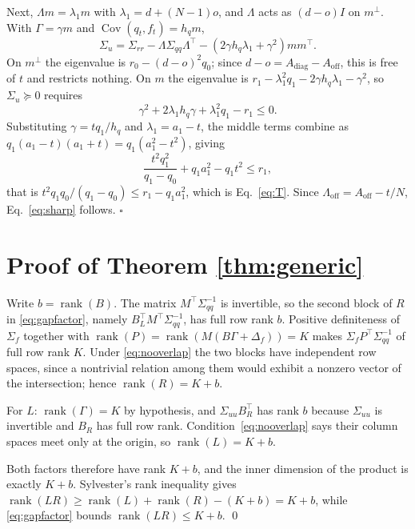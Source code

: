 \documentclass[10pt,twocolumn]{article}
\theoremstyle{remark}
\newcommand{\Cov}{\operatorname{Cov}}
\newcommand{\rank}{\operatorname{rank}}
\begin{document}
Next, $\Lambda m=\lambda_1m$ with $\lambda_1=d+(N-1)o$, and $\Lambda$ acts as
$(d-o)I$ on $m^\perp$. With $\Gamma=\gamma m$ and $\Cov(q_t,f_t)=h_qm$,
\begin{equation}
\Sigma_u=\Sigma_{rr}-\Lambda\Sigma_{qq}\Lambda^\top
-(2\gamma h_q\lambda_1+\gamma^2)mm^\top.
\end{equation}
On $m^\perp$ the eigenvalue is $r_0-(d-o)^2q_0$; since $d-o=A_{\mathrm{diag}}
-A_{\mathrm{off}}$, this is free of $t$ and restricts nothing. On $m$ the
eigenvalue is $r_1-\lambda_1^2q_1-2\gamma h_q\lambda_1-\gamma^2$, so
$\Sigma_u\succeq0$ requires
\begin{equation}
\gamma^2+2\lambda_1h_q\gamma+\lambda_1^2q_1-r_1\le0.
\end{equation}
Substituting $\gamma=tq_1/h_q$ and $\lambda_1=a_1-t$, the middle terms combine
as $q_1(a_1-t)(a_1+t)=q_1(a_1^2-t^2)$, giving
\begin{equation}
\frac{t^2q_1^2}{q_1-q_0}+q_1a_1^2-q_1t^2\le r_1,
\end{equation}
that is $t^2q_1q_0/(q_1-q_0)\le r_1-q_1a_1^2$, which is Eq.~\eqref{eq:T}.
Since $\Lambda_{\mathrm{off}}=A_{\mathrm{off}}-t/N$, Eq.~\eqref{eq:sharp}
follows.
\hfill$\square$

\section{Proof of Theorem \ref{thm:generic}}
\label{app:generic}

Write $b=\rank(B)$. The matrix $M^\top\Sigma_{qq}^{-1}$ is invertible, so the
second block of $R$ in \eqref{eq:gapfactor}, namely
$B_L^\top M^\top\Sigma_{qq}^{-1}$, has full row rank $b$. Positive definiteness
of $\Sigma_f$ together with $\rank(P)=\rank(M(B\Gamma+\Delta_f))=K$ makes
$\Sigma_fP^\top\Sigma_{qq}^{-1}$ of full row rank $K$. Under
\eqref{eq:nooverlap} the two blocks have independent row spaces, since a
nontrivial relation among them would exhibit a nonzero vector of the
intersection; hence $\rank(R)=K+b$.

For $L$: $\rank(\Gamma)=K$ by hypothesis, and $\Sigma_{uu}B_R^\top$ has rank
$b$ because $\Sigma_{uu}$ is invertible and $B_R$ has full row rank.
Condition~\eqref{eq:nooverlap} says their column spaces meet only at the
origin, so $\rank(L)=K+b$.

Both factors therefore have rank $K+b$, and the inner dimension of the product
is exactly $K+b$. Sylvester's rank inequality gives
$\rank(LR)\ge\rank(L)+\rank(R)-(K+b)=K+b$, while \eqref{eq:gapfactor} bounds
$\rank(LR)\le K+b$. \qed
\end{document}
